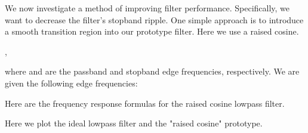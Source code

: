 \documentclass{article}
\begin{document}
\begin{CellGroup}
\begin{CellGroup}
\end{CellGroup}
\begin{CellGroup}



\end{CellGroup}

\end{CellGroup}
\begin{CellGroup}


We now investigate a method of improving filter performance. Specifically, we want to decrease the filter's stopband ripple. One simple approach
is to introduce a smooth transition region into our prototype filter. Here we use a raised cosine.

	,



where  and  are the passband and stopband edge frequencies, respectively.  We are given
the following edge frequencies:



Here are the frequency response formulas for the raised cosine lowpass filter.

Here we plot the ideal lowpass filter and the "raised cosine" prototype.


\end{CellGroup}
\end{document}
